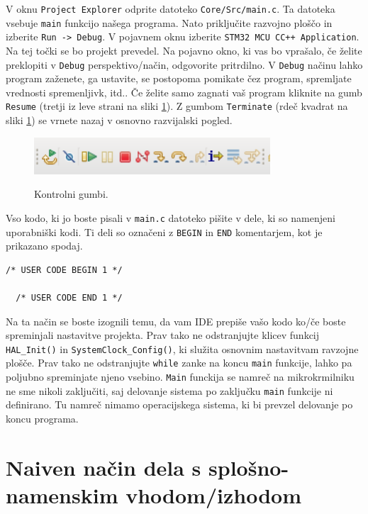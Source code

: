 \documentclass[12pt,letterpaper]{article}
\begin{document}
V oknu \texttt{Project Explorer} odprite datoteko \texttt{Core/Src/main.c}. Ta datoteka vsebuje \texttt{main} funkcijo našega programa. Nato priključite razvojno ploščo in izberite \texttt{Run -> Debug}. V pojavnem oknu izberite \texttt{STM32 MCU CC++ Application}. Na tej točki se bo projekt prevedel. Na pojavno okno, ki vas bo vprašalo, če želite preklopiti v \texttt{Debug} perspektivo/način, odgovorite pritrdilno. V \texttt{Debug} načinu lahko program zaženete, ga ustavite, se postopoma pomikate čez program, spremljate vrednosti spremenljivk, itd.. Če želite samo zagnati vaš program kliknite na gumb \texttt{Resume} (tretji iz leve strani na sliki \ref{kontrolniGumbi}). Z gumbom \texttt{Terminate} (rdeč kvadrat na sliki \ref{kontrolniGumbi}) se vrnete nazaj v osnovno razvijalski pogled.

\begin{figure}[ht!]
  \centering
  \caption{Kontrolni gumbi.}
  \includegraphics[width=250pt]{vaja2/kontrolni_gumbi}
  \label{kontrolniGumbi}
\end{figure}

Vso kodo, ki jo boste pisali v \texttt{main.c} datoteko pišite v dele, ki so namenjeni uporabniški kodi. Ti deli so označeni z \texttt{BEGIN} in \texttt{END} komentarjem, kot je prikazano spodaj.

\begin{center}
\begin{lstlisting}[style=CStyle]
  /* USER CODE BEGIN 1 */

  /* USER CODE END 1 */
\end{lstlisting}
\end{center}

Na ta način se boste izognili temu, da vam IDE prepiše vašo kodo ko/če boste spreminjali nastavitve projekta. Prav tako ne odstranjujte klicev funkcij \texttt{HAL\_Init()} in \texttt{SystemClock\_Config()}, ki služita osnovnim nastavitvam ravzojne plošče. Prav tako ne odstranjujte \texttt{while} zanke na koncu \texttt{main} funkcije, lahko pa poljubno spreminjate njeno vsebino. \texttt{Main} funckija se namreč na mikrokrmilniku ne sme nikoli zaključiti, saj delovanje sistema po zaključku \texttt{main} funkcije ni definirano. Tu namreč nimamo operacijskega sistema, ki bi prevzel delovanje po koncu programa.


\section*{Naiven način dela s splošno-namenskim vhodom/izhodom}
\end{document}
